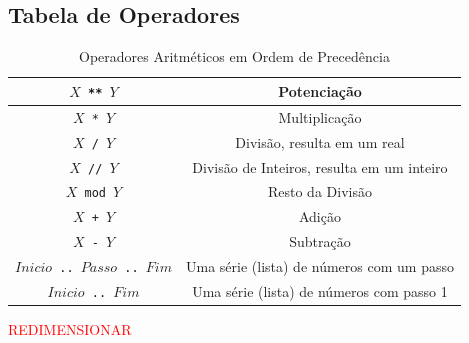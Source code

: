 \subsection{Tabela de Operadores} 
\begin{frame}[fragile]

\begin{small}
		
	\begin{table}
	\label{Operadores Aritméticos}
		\caption{Operadores Aritméticos em Ordem de Precedência}
		\begin{center}
			\begin{tabular}{ c|c } \hline
				\texttt{$X$ ** $Y$}  &   Potenciação \\ \hline 
				\texttt{$X$ * $Y$} &     Multiplicação \\ \hline 
				\texttt{$X$ / $Y$} &     Divisão, resulta em um real \\ \hline 
				\texttt{$X$ // $Y$} &    Divisão de Inteiros, resulta em um inteiro \\ \hline 
				\texttt{$X$ mod $Y$} &   Resto da Divisão\\ \hline
				\texttt{$X$ + $Y$} &     Adição \\ \hline 
				\texttt{$X$ - $Y$} &     Subtração \\ \hline 
				{\tt $Inicio$ \verb!..! $Passo$ \verb!..! $Fim$} & Uma série (lista) de números com um passo\\ 
				\hline 
				{\tt $Inicio$ \verb!..! $Fim$}  &   Uma série (lista) de números com passo 1 \\ \hline
			\end{tabular}
		\end{center}
	\end{table}
	\textcolor{red}{REDIMENSIONAR}
	\end{small}

\end{frame}


